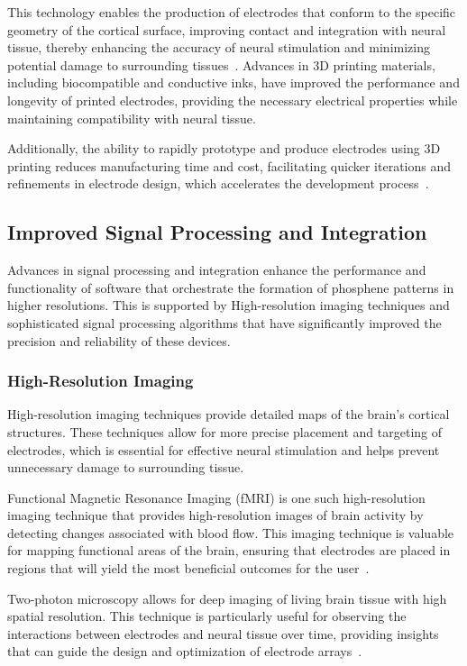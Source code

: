 \documentclass[twocolumn,10pt]{article}
\begin{document}
This technology enables the production of electrodes that conform to the
specific geometry of the cortical surface, improving contact and integration
with neural tissue, thereby enhancing the accuracy of neural stimulation and
minimizing potential damage to surrounding
tissues~\parencite{liuSoftElasticHydrogelbased2019}. Advances in 3D printing
materials, including biocompatible and conductive inks, have improved the
performance and longevity of printed electrodes, providing the necessary
electrical properties while maintaining compatibility with neural tissue.

Additionally, the ability to rapidly prototype and produce electrodes using 3D
printing reduces manufacturing time and cost, facilitating quicker iterations
and refinements in electrode design, which accelerates the development
process~\parencite{zhangClimbinginspiredTwiningElectrodes2019}.

\subsection*{Improved Signal Processing and Integration}
Advances in signal processing and integration enhance the performance and
functionality of software that orchestrate the formation of phosphene patterns
in higher resolutions. This is supported by High-resolution imaging techniques
and sophisticated signal processing algorithms that have significantly improved
the precision and reliability of these devices.

\subsubsection*{High-Resolution Imaging}
High-resolution imaging techniques provide detailed maps of the brain's cortical
structures. These techniques allow for more precise placement and targeting of
electrodes, which is essential for effective neural stimulation and helps
prevent unnecessary damage to surrounding tissue.

Functional Magnetic Resonance Imaging (fMRI) is one such high-resolution imaging
technique that provides high-resolution images of
brain activity by detecting changes associated with blood flow. This imaging
technique is valuable for mapping functional areas of the brain, ensuring that
electrodes are placed in regions that will yield the most beneficial outcomes
for the user~\parencite{landelleInvestigatingHumanSpinal2021}.

Two-photon microscopy allows for deep imaging of living brain tissue with high
spatial resolution. This technique is particularly useful for observing the
interactions between electrodes and neural tissue over time, providing insights
that can guide the design and optimization of electrode
arrays~\parencite{yangIntegratedMicroprismMicroelectrode2024}.
\end{document}
